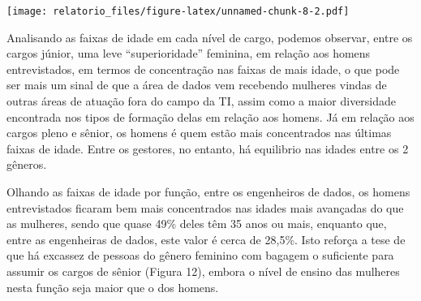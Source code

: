 \documentclass[
]{article}
\begin{document}
\texttt{[image: relatorio\_files/figure-latex/unnamed-chunk-8-2.pdf]}

Analisando as faixas de idade em cada nível de cargo, podemos observar,
entre os cargos júnior, uma leve ``superioridade'' feminina, em relação
aos homens entrevistados, em termos de concentração nas faixas de mais
idade, o que pode ser mais um sinal de que a área de dados vem recebendo
mulheres vindas de outras áreas de atuação fora do campo da TI, assim
como a maior diversidade encontrada nos tipos de formação delas em
relação aos homens. Já em relação aos cargos pleno e sênior, os homens é
quem estão mais concentrados nas últimas faixas de idade. Entre os
gestores, no entanto, há equilibrio nas idades entre os 2 gêneros.

Olhando as faixas de idade por função, entre os engenheiros de dados, os
homens entrevistados ficaram bem mais concentrados nas idades mais
avançadas do que as mulheres, sendo que quase 49\% deles têm 35 anos ou
mais, enquanto que, entre as engenheiras de dados, este valor é cerca de
28,5\%. Isto reforça a tese de que há excassez de pessoas do gênero
feminino com bagagem o suficiente para assumir os cargos de sênior
(Figura 12), embora o nível de ensino das mulheres nesta função seja
maior que o dos homens.
\end{document}
